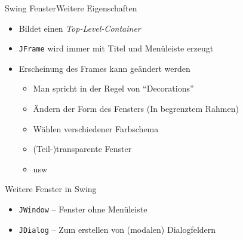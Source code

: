 \begin{frame}{Swing Fenster}{Weitere Eigenschaften}
    \begin{itemize}
        \item Bildet einen \textit{Top-Level-Container}
        \item \texttt{JFrame} wird immer mit Titel und Menüleiste erzeugt
        \item Erscheinung des Frames kann geändert werden
        \begin{itemize}
            \item Man spricht in der Regel von "`Decorations"'
            \item Ändern der Form des Fensters (In begrenztem Rahmen)
            \item Wählen verschiedener Farbschema
            \item (Teil-)transparente Fenster
            \item usw
        \end{itemize}
    \end{itemize}
\end{frame}

\begin{frame}{Weitere Fenster in Swing}
    \begin{itemize}
        \item \texttt{JWindow} -- Fenster ohne Menüleiste
        \item \texttt{JDialog} -- Zum erstellen von (modalen) Dialogfeldern
    \end{itemize}
\end{frame}